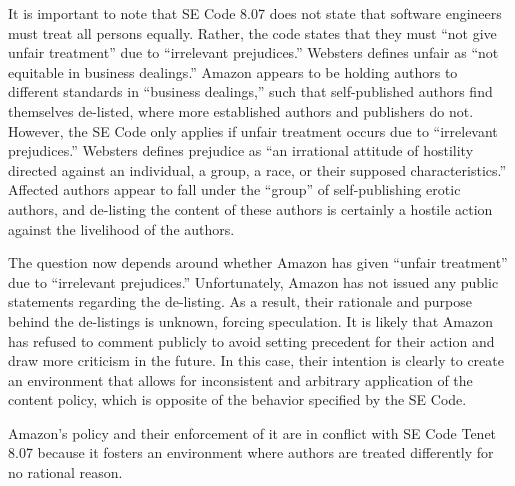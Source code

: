 \documentclass[11pt]{article}
\begin{document}
\begin{multicols}{2}
It is important to note that SE Code 8.07 does not state that software engineers must treat all persons equally.  Rather, the code states that they must ``not give unfair treatment'' due to ``irrelevant prejudices.'' Websters defines unfair as ``not equitable in business dealings.'' \cite{WebstersOnlineDict}  Amazon appears to be holding authors to different standards in ``business dealings,'' such that self-published authors find themselves de-listed, where more established authors and publishers do not.  However, the SE Code only applies if unfair treatment occurs due to ``irrelevant prejudices.''  Websters defines prejudice as ``an irrational attitude of hostility directed against an individual, a group, a race, or their supposed characteristics.'' \cite{WebsterOnlineDict} Affected authors appear to fall under the ``group'' of self-publishing erotic authors, and de-listing the content of these authors is certainly a hostile action against the livelihood of the authors. 

The question now depends around whether Amazon has given ``unfair treatment'' due to ``irrelevant prejudices.''  Unfortunately, Amazon has not issued any public statements regarding the de-listing.  As a result, their rationale and purpose behind the de-listings is unknown, forcing speculation.  It is likely that Amazon has refused to comment publicly to avoid setting precedent for their action and draw more criticism in the future.  In this case, their intention is clearly to create an environment that allows for inconsistent and arbitrary application of the content policy, which is opposite of the behavior specified by the SE Code.

Amazon's policy and their enforcement of it are in conflict with SE Code Tenet 8.07 because it fosters an environment where authors are treated differently for no rational reason.






\end{multicols}
\end{document}
